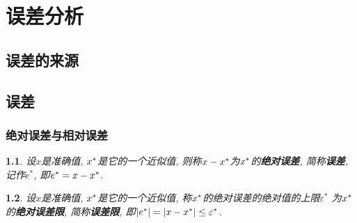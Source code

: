 \chapter{误差分析}

\section{误差的来源}


\section{误差}
\newtheorem{absolute_error}{}[section]
\newtheorem{error_limit}[absolute_error]{}
\newtheorem{relative_error}[absolute_error]{}
\newtheorem{relative_error_limit}[absolute_error]{}
\newtheorem{significant_digits}[absolute_error]{}
\newtheorem{relative_error_limit_with_numbers_of_significant_digits}{\theo}[section]

\subsection{绝对误差与相对误差}

\begin{absolute_error}
    \label{definition:absolute_error}
    设$x$是准确值, $x^\ast$是它的一个近似值, 则称$x-x^\ast$为$x^\ast$的{\bf 绝对误差}, 简称{\bf 误差}, 记作$e^\ast$, 即$e^\ast = x - x^\ast$.
\end{absolute_error}

\medskip

\begin{error_limit}
    \label{definition:error_limit}
    设$x$是准确值, $x^\ast$是它的一个近似值, 称$x^\ast$的绝对误差的绝对值的上限$\varepsilon^\ast$%
    为$x^\ast$的{\bf 绝对误差限}, 简称{\bf 误差限}, 即$|e^\ast| = |x-x^\ast|\le\varepsilon^\ast$.
\end{error_limit}


